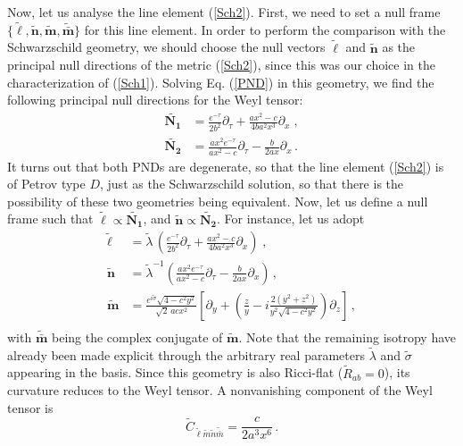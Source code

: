 \documentclass[twocolumn,prd,aps,showpacs,showkeys,amsmath,amssymb]{revtex4-1}
\newcommand{\bl}{\boldsymbol}
\begin{document}
Now, let us analyse the line element (\ref{Sch2}). First, we need to set a null frame $\{\tilde{\bl{\ell}}, \tilde{\bl{n}}, \tilde{\bl{m}}, \tilde{\bl{\bar{m}}}\}$ for this line element. In order to perform the comparison with the Schwarzschild geometry, we should choose the null vectors $\tilde{\bl{\ell}}$ and $\tilde{\bl{n}}$ as the principal null directions of the metric (\ref{Sch2}), since this was our choice in the characterization of (\ref{Sch1}). Solving Eq. (\ref{PND}) in this geometry, we find the following principal null directions for the Weyl tensor:
\begin{align*}
 \tilde{\bl{N_1}} &=  \frac{e^{-\tau} }{2b^2}\partial_\tau + \frac{ax^2 - c }{4b a^2 x^3}\partial_x \;,\\
  \tilde{\bl{N_2}} &=  \frac{ a x^2 e^{-\tau} }{ ax^2 -c} \partial_\tau - \frac{b}{2ax} \partial_x \,.
\end{align*}
It turns out that both PNDs are degenerate, so that the line element (\ref{Sch2}) is of Petrov type $D$, just as the Schwarzschild solution, so that there is the possibility of these two geometries being equivalent. Now, let us define a null frame such that $\tilde{\bl{\ell}}\propto \tilde{\bl{N_1}}$, and $\tilde{\bl{n}}\propto \tilde{\bl{N_2}}$. For instance, let us adopt
\begin{align*}
 \tilde{\bl{\ell}} &=  \tilde{\lambda} \,\left( \frac{e^{-\tau} }{2b^2}\partial_\tau +   \frac{ax^2 - c }{4b a^2 x^3}\partial_x \right)\;,\\
  \tilde{\bl{n}} &=  \tilde{\lambda}^{-1}  \left( \frac{ a x^2 e^{-\tau} }{ ax^2 -c} \partial_\tau - \frac{b}{2ax} \partial_x \right)\,, \\
  \tilde{\bl{m}} &=
  \frac{ e^{i\tilde{\sigma} } \sqrt{4 - c^2 y^2}  }{\sqrt{2}\,a c x^2} \left[  \partial_y +
  \left(  \frac{ z  }{  y}  - i \frac{2(y^2 + z^2)}{y^2  \sqrt{4 - c^2 y^2} }  \right)\partial_z \right] \,, \\
\end{align*}
with $\tilde{\bl{\bar{m}}}$ being the complex conjugate of  $\tilde{\bl{m}}$. Note that the remaining isotropy have already been made explicit through the arbitrary real parameters $\tilde{\lambda}$ and $\tilde{\sigma}$ appearing in the basis. Since this geometry is also Ricci-flat ($\tilde{R}_{ab}=0$), its curvature reduces to the Weyl tensor. A nonvanishing component of the Weyl tensor is
\begin{equation}\label{Csch2}
  \tilde{C}_{\tilde{\ell} \tilde{m}  \tilde{n} \tilde{\bar{m}}} = \frac{c}{2 a^3 x^6} \,.
\end{equation}
\end{document}
